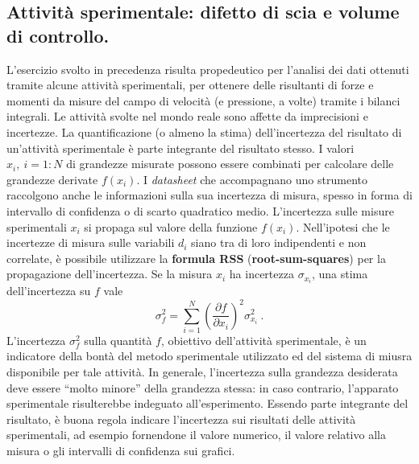 \subsection*{Attività sperimentale: difetto di scia e volume di controllo.}

L'esercizio svolto in precedenza risulta propedeutico per l'analisi dei dati ottenuti tramite alcune attività sperimentali, per ottenere delle risultanti di forze e momenti da misure del campo di velocità (e pressione, a volte) tramite i bilanci integrali.
Le attività svolte nel mondo reale sono affette da imprecisioni e incertezze. La quantificazione (o almeno la stima) dell'incertezza del risultato di un'attività sperimentale è parte integrante del risultato stesso. 
I valori $x_i, \ i=1:N$ di grandezze misurate possono essere combinati per calcolare delle grandezze derivate $f(x_i)$. I \textit{datasheet} che accompagnano uno strumento raccolgono anche le informazioni sulla sua incertezza di misura, spesso in forma di intervallo di confidenza o di scarto quadratico medio. L'incertezza sulle misure sperimentali $x_i$ si propaga sul valore della funzione $f(x_i)$. Nell'ipotesi che le incertezze di misura sulle variabili $d_i$ siano tra di loro indipendenti e non correlate, è possibile utilizzare la \textbf{formula RSS} (\textbf{root-sum-squares}) per la propagazione dell'incertezza. Se la misura $x_i$ ha incertezza $\sigma_{x_i}$, una stima dell'incertezza su $f$ vale
\begin{equation}
  \sigma_f^2 = \sum_{i=1}^{N} \left( \dfrac{\partial f}{\partial x_i} \right)^2 \sigma_{x_i}^2 \ .
\end{equation}
%
L'incertezza $\sigma^2_f$ sulla quantità $f$, obiettivo dell'attività sperimentale, è un indicatore della bontà del metodo sperimentale utilizzato ed del sistema di miusra disponibile per tale attività. In generale, l'incertezza sulla grandezza desiderata deve essere ``molto minore'' della grandezza stessa: in caso contrario, l'apparato sperimentale risulterebbe indeguato all'esperimento.
Essendo parte integrante del risultato, è buona regola indicare l'incertezza sui risultati delle attività sperimentali, ad esempio fornendone il valore numerico, il valore relativo alla misura o gli intervalli di confidenza sui grafici.

